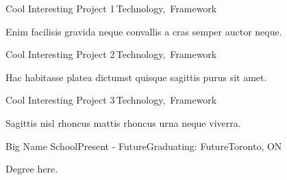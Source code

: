 \documentclass{custom}
\begin{document}
\vspace{-0.75em}
\begin{rSection}
	    \begin{rSubsection}{Cool Interesting Project 1}{}{\,Technology,\, Framework}{}
	\item Enim facilisis gravida neque convallis a cras semper auctor neque.
    \end{rSubsection}
	    \begin{rSubsection}{Cool Interesting Project 2}{}{\,Technology,\, Framework}{}
        \item Hac habitasse platea dictumst quisque sagittis purus sit amet. 
    \end{rSubsection}
	    \begin{rSubsection}{Cool Interesting Project 3}{}{\,Technology,\, Framework}{}
	\item Sagittis nisl rhoncus mattis rhoncus urna neque viverra. 
    \end{rSubsection}
\end{rSection}
\vspace{-0.75em}

\begin{rSection}
	\begin{rSubsection}{Big Name School}{Present - Future}{Graduating: Future}{Toronto, ON}
	\item Degree here.
    \end{rSubsection}
\end{rSection}
\end{document}
